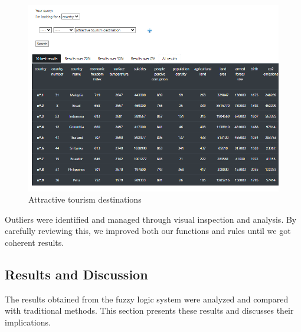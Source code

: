 \documentclass[fleqn,11pt]{article}
\begin{document}
\begin{figure}[H]
    \centering
    \includegraphics[width=\linewidth]{Images/tourism destinations.png}
    \caption{Attractive tourism destinations}
\end{figure}

Outliers were identified and managed through visual inspection and analysis. By carefully reviewing this, we improved both our functions and rules until we got coherent results. 


\subsection{Results and Discussion}

The results obtained from the fuzzy logic system were analyzed and compared with traditional methods. This section presents these results and discusses their implications.
\end{document}
